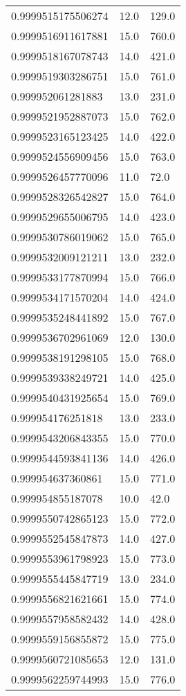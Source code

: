 \begin{center}
\begin{supertabular}[H]{p{0.30\textwidth}p{0.05\textwidth}p{0.05\textwidth}}
0.9999515175506274 & 12.0 & 129.0 \\ 
0.9999516911617881 & 15.0 & 760.0 \\ 
0.9999518167078743 & 14.0 & 421.0 \\ 
0.9999519303286751 & 15.0 & 761.0 \\ 
0.999952061281883 & 13.0 & 231.0 \\ 
0.9999521952887073 & 15.0 & 762.0 \\ 
0.9999523165123425 & 14.0 & 422.0 \\ 
0.9999524556909456 & 15.0 & 763.0 \\ 
0.9999526457770096 & 11.0 & 72.0 \\ 
0.9999528326542827 & 15.0 & 764.0 \\ 
0.9999529655006795 & 14.0 & 423.0 \\ 
0.9999530786019062 & 15.0 & 765.0 \\ 
0.9999532009121211 & 13.0 & 232.0 \\ 
0.9999533177870994 & 15.0 & 766.0 \\ 
0.9999534171570204 & 14.0 & 424.0 \\ 
0.9999535248441892 & 15.0 & 767.0 \\ 
0.9999536702961069 & 12.0 & 130.0 \\ 
0.9999538191298105 & 15.0 & 768.0 \\ 
0.9999539338249721 & 14.0 & 425.0 \\ 
0.9999540431925654 & 15.0 & 769.0 \\ 
0.999954176251818 & 13.0 & 233.0 \\ 
0.9999543206843355 & 15.0 & 770.0 \\ 
0.9999544593841136 & 14.0 & 426.0 \\ 
0.999954637360861 & 15.0 & 771.0 \\ 
0.999954855187078 & 10.0 & 42.0 \\ 
0.9999550742865123 & 15.0 & 772.0 \\ 
0.9999552545847873 & 14.0 & 427.0 \\ 
0.9999553961798923 & 15.0 & 773.0 \\ 
0.9999555445847719 & 13.0 & 234.0 \\ 
0.9999556821621661 & 15.0 & 774.0 \\ 
0.9999557958582432 & 14.0 & 428.0 \\ 
0.9999559156855872 & 15.0 & 775.0 \\ 
0.9999560721085653 & 12.0 & 131.0 \\ 
0.9999562259744993 & 15.0 & 776.0 \\ 

\end{supertabular}
\end{center}
